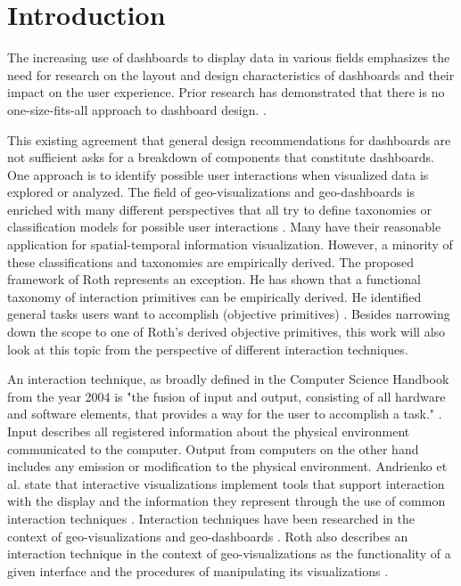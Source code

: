 \chapter{Introduction}
The increasing use of dashboards to display data in various fields emphasizes the need for research on the layout
and design characteristics of dashboards and their impact on the user experience. Prior research has demonstrated
that there is no one-size-fits-all approach to dashboard design. \citep*{Yigitbasioglu.2012,Sarikaya.2018}.

This existing agreement that general design recommendations for dashboards are not sufficient asks for a breakdown
of components that constitute dashboards. One approach is to identify possible user interactions when visualized
data is explored or analyzed. The field of geo-visualizations and geo-dashboards is enriched with many different
perspectives that all try to define taxonomies or classification models for possible user interactions
\citep*{Andrienko.2003,Crampton.2002}. Many have their reasonable application for spatial-temporal information visualization.
However, a minority of these classifications and taxonomies are empirically derived. The proposed framework of Roth represents
an exception. He has shown that a functional taxonomy of interaction primitives can be empirically derived. He identified
general tasks users want to accomplish (objective primitives) \citep{Roth.2013}. Besides narrowing down the scope to one of
Roth's derived objective primitives, this work will also look at this topic from the perspective of different interaction
techniques.

An interaction technique, as broadly defined in the Computer Science Handbook from the year 2004 is "the fusion of input and
output, consisting of all hardware and software elements, that provides a way for the user to accomplish a task."
\citep*{Hinckley.2004}. Input describes all registered information about the physical environment communicated to the computer. Output from
computers on the other hand includes any emission or modification to the physical environment. Andrienko et al. state that
interactive visualizations implement tools that support interaction with the display and the information they represent through
the use of common interaction techniques \citep*{Andrienko.2020}. Interaction techniques have been researched in the context 
of geo-visualizations and geo-dashboards \citep*{Keim.2005,Lobo.2015,vanTonder.2011}.
Roth also describes an interaction technique in the context of geo-visualizations as the functionality of a given interface and
the procedures of manipulating its visualizations \citep{Roth.2013}.

